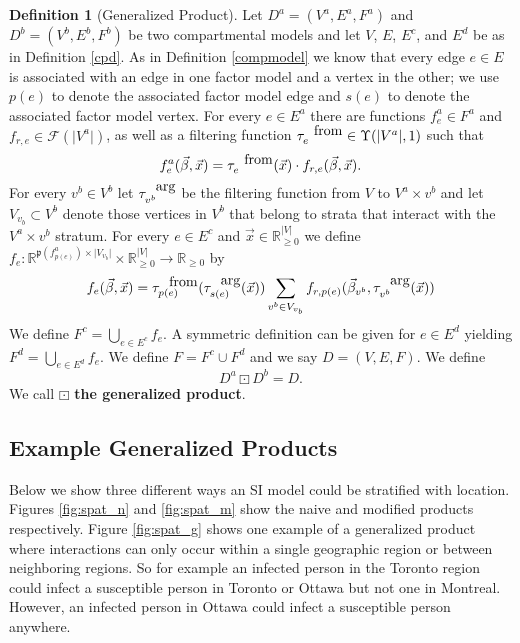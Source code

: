 \documentclass[pdflatex,sn-basic]{sn-jnl}%
\theoremstyle{definition}
\newtheorem{definition}{Definition}
\newcommand{\R}{\mathbb{R}}%
\newcommand{\Rnn}{\mathbb{R}_{\ge 0}}%
\newcommand{\abs}[1]{\lvert #1 \rvert}%
\newcommand{\pardim}[1]{\mathfrak{p}(#1)}%
\newcommand{\betavec}{\vec{\beta}}
\newcommand{\xvec}{\vec{x}}
\newcommand{\fr}{\ensuremath{\mathcal F}}
\newcommand{\tauf}{\tau^{\mbox{\tiny from}}}
\newcommand{\taua}{\tau^{\mbox{\tiny arg}}}
\begin{document}
\begin{definition}[Generalized Product]
    Let $D^a = (V^a, E^a, F^a)$ and $D^b = (V^b, E^b, F^b)$ be two compartmental models and let $V$, $E$, $E^c$, and $E^d$ be as in Definition \ref{cpd}. As in Definition \ref{compmodel} we know that every edge $e\in E$ is associated with an edge in one factor model and a vertex in the other; we use $p(e)$ to denote the associated factor model edge and $s(e)$ to denote the associated factor model vertex. For every $e\in E^a$ there are functions $f^a_{e}\in F^a$ and $f_{r,e}\in \fr(\abs{V^a})$, as well as a filtering function $\tauf_{e}\in\Upsilon(\abs{V^a}, 1)$ such that
    \begin{equation}
        f^a_{e}(\betavec, \xvec) = \tauf_e(\xvec)\cdot f_{r,e}(\betavec, \xvec).
    \end{equation}
        For every $v^b\in V^b$ let $\taua_{v^b}$ be the filtering function from $V$ to $V^a\times v^b$ and let $V_{v_b}\subset V^b$ denote those vertices in $V^b$ that belong to strata that interact with the $V^a\times v^b$ stratum. For every $e\in E^c$ and $\vec{x}\in\Rnn^{\abs{V}}$ we define $f_e:\R^{\pardim{f^a_{p(e)}}\times \abs{V_{v_b}}}\times\Rnn^{\abs{V}}\rightarrow\Rnn$ by
     \begin{equation}
        f_e(\vec{\beta}, \vec{x}) = \tauf_{p(e)}(\taua_{s(e)}(\xvec))\sum\limits_{v^b\in V_{v_b}} f_{r,p(e)}(\betavec_{v^b},\taua_{v^b}(\xvec))
     \end{equation}
     We define $F^{c} = \bigcup\limits_{e\in E^c}f_e$. A symmetric definition can be given for $e\in E^d$ yielding $F^{d} = \bigcup\limits_{e\in E^d}f_e$. We define $F = F^{c}\cup F^{d}$ and we say $D=(V, E, F)$. We define
    \begin{equation}
        D^a\boxdot D^b = D.
    \end{equation} We call $\boxdot$ \textbf{the generalized product}.
\end{definition}

\subsection{Example Generalized Products}

Below we show three different ways an SI model could be stratified with location. Figures \ref{fig:spat_n} and \ref{fig:spat_m} show the naive and modified products respectively. Figure \ref{fig:spat_g} shows one example of a generalized product where interactions can only occur within a single geographic region or between neighboring regions. So for example an infected person in the Toronto region could infect a susceptible person in Toronto or Ottawa but not one in Montreal. However, an infected person in Ottawa could infect a susceptible person anywhere. 
\end{document}
